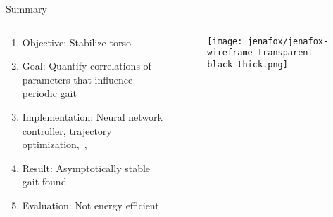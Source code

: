 \begin{frame}{Summary}%
    \begin{columns}[T,onlytextwidth]%
        \begin{column}[T]{0.48\textwidth}%
            \begin{enumerate}
                \item Objective: Stabilize torso
                \item Goal: Quantify correlations of parameters that influence periodic gait
                \item Implementation: Neural network controller, trajectory optimization,~,~
                \item Result: Asymptotically stable gait found
                \item Evaluation: Not energy efficient
            \end{enumerate}%
        \end{column}%
        \begin{column}[T]{0.48\textwidth}%
            \begin{figure}[htb]%
                \centering%
                \texttt{[image: jenafox/jenafox-wireframe-transparent-black-thick.png]}%
            \end{figure}%
        \end{column}%
    \end{columns}%
\end{frame}%
%